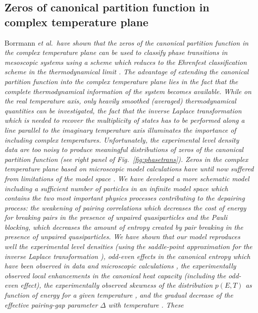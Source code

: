 \documentclass[sort&compress,final,numberedheadings]{aipproc}
\begin{document}
\subsection{Zeros of canonical partition function in complex temperature plane}

Borrmann \sl et al.\ \rm have shown that the zeros of the canonical partition 
function in the complex temperature plane can be used to classify phase 
transitions in mesoscopic systems using a scheme which reduces to the Ehrenfest
classification scheme in the thermodynamical limit \cite{BM00}. The advantage 
of extending the canonical partition function into the complex temperature 
plane lies in the fact that the complete thermodynamical information of the 
system becomes available. While on the real temperature axis, only heavily 
smoothed (averaged) thermodynamical quantities can be investigated, the fact 
that the inverse Laplace transformation which is needed to recover the 
multiplicity of states has to be performed along a line parallel to the 
imaginary temperature axis illuminates the importance of including complex 
temperatures. Unfortunately, the experimental level density data are too noisy 
\cite{Bo01} to produce meaningful distributions of zeros of the canonical 
partition function (see right panel of Fig.\ \ref{fig:phasetrans}). Zeros in 
the complex temperature plane based on microscopic model calculations have 
until now suffered from limitations of the model space \cite{BD01}. We have 
developed a more schematic model \cite{GH01,GH01b,SG02b} including a sufficient
number of particles in an infinite model space which contains the two most 
important physics processes contributing to the depairing process: the 
weakening of pairing correlations which decreases the cost of energy for 
breaking pairs in the presence of unpaired quasiparticles and the Pauli 
blocking, which decreases the amount of entropy created by pair breaking in the
presence of unpaired quasiparticles. We have shown that our model reproduces 
well the experimental level densities (using the saddle-point approximation for
the inverse Laplace transformation \cite{GH01b}), odd-even effects in the 
canonical entropy \cite{GH01} which have been observed in data and microscopic 
calculations \cite{GB00}, the experimentally observed local enhancements in the
canonical heat capacity \cite{GH01b} (including the odd-even effect), the 
experimentally observed skewness of the distribution $p(E,T)$ as function of 
energy for a given temperature \cite{GB03}, and the gradual decrease of the 
effective pairing-gap parameter $\Delta$ with temperature \cite{SG02b}. These 
\end{document}
